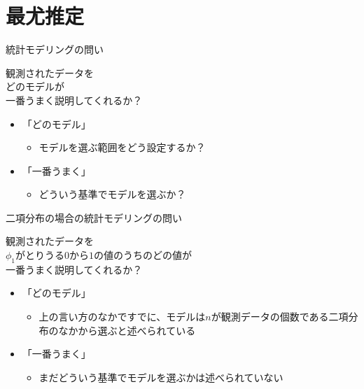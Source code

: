 \documentclass[aspectratio=169,unicode,dvipdfmx,14pt]{beamer}
\begin{document}
\section{最尤推定}

\begin{frame}{統計モデリングの問い}
\vspace{-.5in}
\begin{block}{}
\large \center 観測されたデータを\\どのモデルが\\一番うまく説明してくれるか？
\end{block}
\vspace{.3in}
\begin{itemize}
\item 「どのモデル」
\begin{itemize}
\item モデルを選ぶ範囲をどう設定するか？
\end{itemize}
\item 「一番うまく」
\begin{itemize}
\item どういう基準でモデルを選ぶか？
\end{itemize}
\end{itemize}
\end{frame}

\begin{frame}{二項分布の場合の統計モデリングの問い}
\vspace{-.5in}
\begin{block}{}
\large \center 観測されたデータを\\
$\phi_1$がとりうる$0$から$1$の値のうちのどの値が\\
一番うまく説明してくれるか？
\end{block}
\vspace{.3in}
\begin{itemize}
\item 「どのモデル」
\begin{itemize}
\item 上の言い方のなかですでに、モデルは$n$が観測データの個数である二項分布のなかから選ぶと述べられている
\end{itemize}
\item 「一番うまく」
\begin{itemize}
\item まだどういう基準でモデルを選ぶかは述べられていない
\end{itemize}
\end{itemize}
\end{frame}
\end{document}
